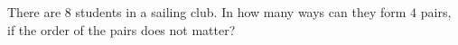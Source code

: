 There are $8$ students in a sailing club. In how many ways can they form $4$ pairs, if the order of the pairs does not matter?

